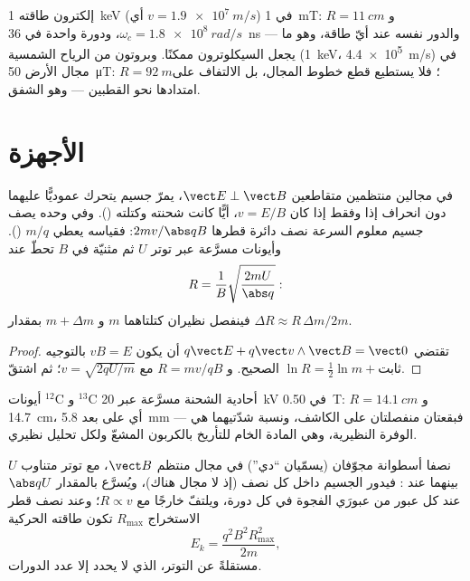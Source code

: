 \begin{example}\label{ex:b1:charged-particles:orders}
إلكترون طاقته \qty{1}{keV} (أي $v = \qty{1.9e7}{m/s}$) في \qty{1}{mT}:
$R = \qty{11}{cm}$ و $\omega_c = \qty{1.8e8}{rad/s}$، ودورة واحدة في
\qty{36}{ns} --- والدور نفسه عند أيّ طاقة، وهو ما يجعل
السيكلوترون ممكنًا. وبروتون من الرياح الشمسية (\qty{1}{keV}،
\qty{4.4e5}{m/s}) في مجال الأرض \qty{50}{\micro T}: $R = \qty{92}{m}$؛
فلا يستطيع قطع خطوط المجال، بل الالتفاف على امتدادها نحو
القطبين --- وهو الشفق.
\end{example}

\section{الأجهزة}

\begin{proposition}\label{prop:b1:charged-particles:spectrometer}
في مجالين منتظمين متقاطعين $\vect E \perp \vect B$، يمرّ جسيم يتحرك
عموديًّا عليهما دون انحراف إذا وفقط إذا كان $v = E/B$، أيًّا كانت
شحنته وكتلته (\emph{}). وفي  وحده يصف
جسيم معلوم السرعة نصف دائرة قطرها $2mv/\abs qB$:
فقياسه يعطي $m/q$ (\emph{}). وأيونات مسرَّعة
عبر توتر $U$ ثم مثنيّة في $B$ تحطّ عند
\[
R = \frac{1}{B}\sqrt{\frac{2mU}{\abs q}} :
\]
فينفصل نظيران كتلتاهما $m$ و $m + \Delta m$ بمقدار $\Delta R \approx
R\,\Delta m/2m$.
\end{proposition}

\begin{proof}
تقتضي $q\vect E + q\vect v\wedge\vect B = \vect 0$ أن يكون $vB = E$ بالتوجيه
الصحيح. و $R = mv/qB$ مع $v = \sqrt{2qU/m}$؛ ثم اشتقّ
$\ln R = \tfrac12\ln m + \text{ثابت}$.
\end{proof}

\begin{example}\label{ex:b1:charged-particles:isotopes}
أيونات $^{12}$C و $^{13}$C أحادية الشحنة مسرَّعة عبر \qty{20}{kV}
في \qty{0.50}{T}: $R = \qty{14.1}{cm}$ و \qty{14.7}{cm}، أي على بعد \qty{5.8}{mm}
--- فبقعتان منفصلتان على الكاشف، ونسبة شدّتيهما
هي الوفرة النظيرية، وهي المادة الخام للتأريخ بالكربون المشعّ
ولكل تحليل نظيري.
\end{example}

\begin{proposition}[السيكلوترون]\label{prop:b1:charged-particles:cyclotron}
نصفا أسطوانة مجوّفان (يسمّيان ``دي'') في مجال منتظم $\vect B$، مع
توتر متناوب $U$ بينهما عند : فيدور
الجسيم داخل كل نصف (إذ لا مجال هناك)، ويُسرَّع بالمقدار
$\abs qU$ عند كل عبور من عبورَي الفجوة في كل دورة، ويلتفّ خارجًا
مع $R \propto v$؛ وعند نصف قطر الاستخراج $R_{\max}$ تكون طاقته
الحركية
\[
E_k = \frac{q^2B^2R_{\max}^2}{2m},
\]
مستقلةً عن التوتر، الذي لا يحدد إلا عدد الدورات.
\end{proposition}

